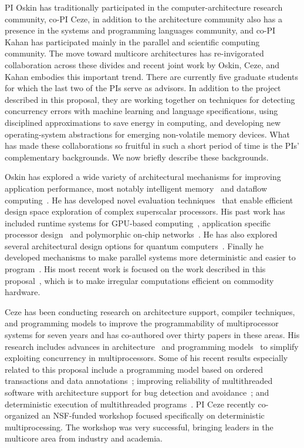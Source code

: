 PI Oskin has traditionally participated in the computer-architecture research
community, co-PI Ceze, in addition to the architecture community also has a
presence in the systems and programming languages community, and co-PI Kahan
has participated mainly in the parallel and scientific computing community.
The move toward multicore architectures has re-invigorated collaboration
across these divides and recent joint work by Oskin, Ceze, and Kahan
embodies this important trend. There are currently five graduate students for
which the last two of the PIs serve as advisors. In addition to the project
described in this proposal, they are working together on techniques for
detecting concurrency errors with machine learning and language
specifications, using disciplined approximations to save energy in computing,
and developing new operating-system abstractions for emerging non-volatile
memory devices. What has made these collaborations so fruitful in such a short
period of time is the PIs' complementary backgrounds. We now briefly describe
these backgrounds.

Oskin has explored a wide variety of architectural mechanisms for improving application performance, most notably intelligent memory~\cite{activepages} and dataflow computing~\cite{wavescalar-micro, wavescalar-isca}.  He has developed novel evaluation techniques~\cite{hls} that enable efficient design space exploration of complex superscalar processors.  His past work has included runtime systems for GPU-based computing~\cite{oskin-gpu}, application specific processor design~\cite{sherpa} and polymorphic on-chip networks~\cite{polynetworks}.  He has also explored several architectural design options for quantum computers~\cite{quantum-isca03, quantum-isca05, quantum-isca08}.  Finally he developed mechanisms to make parallel systems more deterministic and easier to program~\cite{dmp}.  His most recent work is focused on the work described in this proposal~\cite{Nelson:hotpar2011}, which is to make irregular computations efficient on commodity hardware.

Ceze has been conducting research on architecture support, compiler techniques, and programming models to improve the programmability of multiprocessor systems for seven years and has co-authored over thirty papers in these areas.  His research includes advances in architecture~\cite{tlsooo, bulk, bulksc, swbulk, cyclops, dmp, delorean} and programming models~\cite{colorama, ipot, posh} to simplify exploiting concurrency in multiprocessors. Some of his recent results especially related to this proposal include a programming model based on ordered transactions and data annotations~\cite{ipot}; improving reliability of multithreaded software with architecture support for bug detection and avoidance~\cite{atomaid, aatoppicks, bugaboo, oshajava, cs-isca10, ce-isca10}; and deterministic execution of multithreaded programs~\cite{dmp, dmptoppicks, asplos10coredet, dmpos}. PI Ceze recently co-organized an NSF-funded workshop focused specifically on deterministic multiprocessing. The workshop was very successful, bringing leaders in the multicore area from industry and academia.


